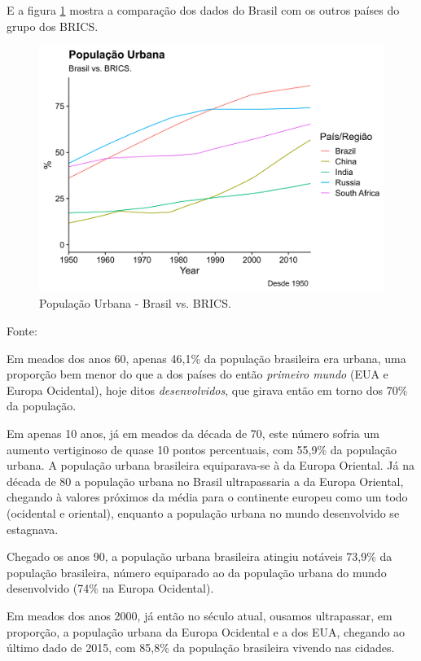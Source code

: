\documentclass[
	12pt,				%
	oneside,			%
	a4paper,			%
	chapter=TITLE,		%
	section=TITLE,		%
	english,			%
	brazil				%
	]{abntex2}
\newcommand{\bcenter}{\begin{center}}
\newcommand{\ecenter}{\end{center}}
\begin{document}
E a figura \ref{fig:pop-urb-brazil-brics} mostra a comparação dos dados do
Brasil com os outros países do grupo dos BRICS.
\begin{figure}[H]

{\centering \includegraphics[width=0.8\linewidth]{images/pop-urb-brazil-brics-1} 

}

\caption{População Urbana - Brasil vs. BRICS.}\label{fig:pop-urb-brazil-brics}
\end{figure}
\bcenter

Fonte: \textcite{doi:10.1177/0959683609356587}
\ecenter

Em meados dos anos 60, apenas 46,1\% da população brasileira era urbana, uma
proporção bem menor do que a dos países do então \emph{primeiro mundo} (EUA e Europa
Ocidental), hoje ditos \emph{desenvolvidos}, que girava então em torno dos 70\% da
população.

Em apenas 10 anos, já em meados da década de 70, este número sofria um aumento
vertiginoso de quase 10 pontos percentuais, com 55,9\% da população urbana. A
população urbana brasileira equiparava-se à da Europa Oriental.
Já na década de 80 a população urbana no Brasil ultrapassaria a da Europa
Oriental, chegando à valores próximos da média para o continente europeu como um
todo (ocidental e oriental), enquanto a população urbana no mundo desenvolvido
se estagnava.

Chegado os anos 90, a população urbana brasileira atingiu notáveis 73,9\% da
população brasileira, número equiparado ao da população urbana do mundo
desenvolvido (74\% na Europa Ocidental).

Em meados dos anos 2000, já então no século atual, ousamos ultrapassar, em
proporção, a população urbana da Europa Ocidental e a dos EUA, chegando ao
último dado de 2015, com 85,8\% da população brasileira vivendo nas cidades.
\end{document}
